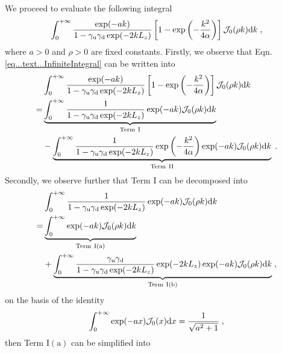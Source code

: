 We proceed to evaluate the following integral
\begin{equation}\label{eq...text...InfiniteIntegral}
\int_0^{+\infty} \frac{ \exp(-ak)}{1-\gamma_{\mathrm{u}}\gamma_{\mathrm{d}}\exp(-2kL_z)} \left[1-\exp\left(-\frac{k^2}{4\alpha}\right)\right]\mathcal{J}_0(\rho k)\mathrm{d} k\;,    
\end{equation}
where $a>0$ and $\rho>0$ are fixed constants. Firstly, we observe that Eqn. \eqref{eq...text...InfiniteIntegral} can be written into
\begin{align*}
   & \int_0^{+\infty} \frac{ \exp(-ak)}{1-\gamma_{\mathrm{u}}\gamma_{\mathrm{d}}\exp(-2kL_z)} \left[1-\exp\left(-\frac{k^2}{4\alpha}\right)\right]\mathcal{J}_0(\rho k)\mathrm{d} k\\
   =&\underbrace{\int_0^{+\infty} \frac{1}{1-\gamma_{\mathrm{u}}\gamma_{\mathrm{d}}\exp(-2kL_z)}  \exp(-ak) \mathcal{J}_0(\rho k)\mathrm{d} k}_{\text{Term}~\mathrm{I}}\\
   &-\underbrace{\int_0^{+\infty} \frac{1}{1-\gamma_{\mathrm{u}}\gamma_{\mathrm{d}}\exp(-2kL_z)}\exp\left(-\frac{k^2}{4\alpha}\right)  \exp(-ak) \mathcal{J}_0(\rho k)\mathrm{d} k}_{\text{Term}~\mathrm{II}}\;.
\end{align*}
Secondly, we observe further that Term $\mathrm{I}$ can be decomposed into
\begin{align*}
&\int_0^{+\infty} \frac{1}{1-\gamma_{\mathrm{u}}\gamma_{\mathrm{d}}\exp(-2kL_z)}  \exp(-ak) \mathcal{J}_0(\rho k)\mathrm{d} k\\
=&\underbrace{\int_0^{+\infty}   \exp(-ak) \mathcal{J}_0(\rho k)\mathrm{d} k}_{\text{Term}~\mathrm{I(a)}}\\
&+\underbrace{\int_0^{+\infty} \frac{\gamma_{\mathrm{u}}\gamma_{\mathrm{d}}}{1-\gamma_{\mathrm{u}}\gamma_{\mathrm{d}}\exp(-2kL_z)}  \exp(-2kL_z)\exp(-ak) \mathcal{J}_0(\rho k)\mathrm{d} k}_{\text{Term}~\mathrm{I(b)}}\;,
\end{align*}
on the basis of the identity
\begin{equation*}
    \int_0^{+\infty}\exp(-ax)\mathcal{J}_0(x)\mathrm{d} x=\frac{1}{\sqrt{a^2+1}}\;,
\end{equation*}
then Term $\mathrm{I(a)}$ can be simplified into 
